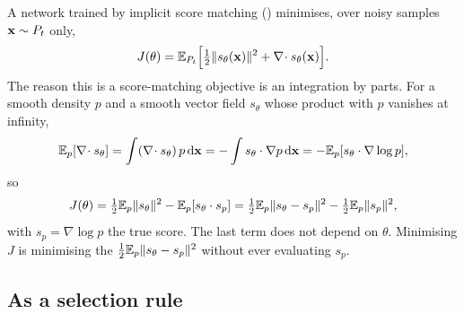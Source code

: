 A network trained by implicit score matching ()
minimises, over noisy samples $\mathbf{x}\sim P_t$ only,
\begin{equation}
  J(\theta)=\mathbb{E}_{P_t}\Bigl[\tfrac12\lVert s_\theta(\mathbf{x})\rVert^2+\nabla\!\cdot s_\theta(\mathbf{x})\Bigr].
  \label{eq:ism}
\end{equation}
The reason this is a score-matching objective is an integration by parts. For a
smooth density $p$ and a smooth vector field $s_\theta$ whose product with $p$ vanishes
at infinity,
\begin{equation}
  \mathbb{E}_p[\nabla\!\cdot s_\theta]=\int(\nabla\!\cdot s_\theta)\,p\,\mathrm{d}\mathbf{x}=-\int s_\theta\cdot\nabla p\,\mathrm{d}\mathbf{x}
  =-\mathbb{E}_p[s_\theta\cdot\nabla\log p],
\end{equation}
so
\begin{equation}
  J(\theta)=\tfrac12\mathbb{E}_p\lVert s_\theta\rVert^2-\mathbb{E}_p[s_\theta\cdot s_p]
  =\tfrac12\mathbb{E}_p\lVert s_\theta-s_p\rVert^2-\tfrac12\mathbb{E}_p\lVert s_p\rVert^2 ,
  \label{eq:hyvarinen}
\end{equation}
with $s_p=\nabla\log p$ the true score. The last term does not depend on $\theta$.
Minimising $J$ is minimising the  $\tfrac12\mathbb{E}_p\lVert s_\theta-s_p\rVert^2$
without ever evaluating $s_p$.

\subsection{As a selection rule}


